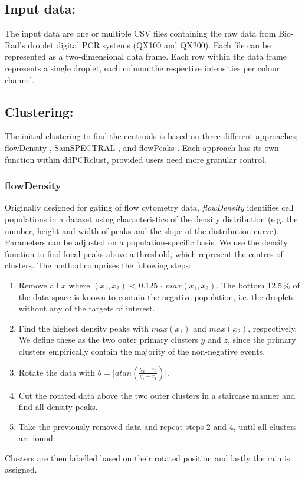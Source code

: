 \documentclass{article}
\begin{document}
\subsection{Input data:}
The input data are one or multiple CSV files containing the raw data from Bio-Rad's droplet digital PCR systems (QX100 and QX200). Each file can be represented as a two-dimensional data frame. Each row within the data frame represents a single droplet, each column the respective intensities per colour channel.

\subsection{Clustering:}
The initial clustering to find the centroids is based on three different approaches; flowDensity \cite{malek2015flowdensity}, SamSPECTRAL \cite{zare2010data}, and flowPeaks \cite{ge2012flowpeaks}. Each approach has its own function within ddPCRclust, provided users need more granular control.

\subsubsection{flowDensity}
Originally designed for gating of flow cytometry data, \emph{flowDensity} identifies cell populations in a dataset using characteristics of the density distribution (e.g. the number, height and width of peaks and the slope of the distribution curve). Parameters can be adjusted on a population-specific basis. We use the density function to find local peaks above a threshold, which represent the centres of clusters. The method comprises the following steps:
\begin{enumerate}
\item Remove all $x$ where $(x_1,x_2)$ < 0.125$\,\cdot\,max(x_1,x_2)$. The bottom 12.5$\,\%$ of the data space is known to contain the negative population, i.e. the droplets without any of the targets of interest.
\item Find the highest density peaks with $max(x_1)$ and $max(x_2)$, respectively. We define these as the two outer primary clusters $y$ and $z$, since the primary clusters empirically contain the majority of the non-negative events.
\item Rotate the data with $\theta = \lvert atan(\frac{y_2 - z_2}{y_1 - z_1}) \rvert$.
\item Cut the rotated data above the two outer clusters in a staircase manner and find all density peaks.
\item Take the previously removed data and repeat steps 2 and 4, until all clusters are found.
\end{enumerate}
Clusters are then labelled based on their rotated position and lastly the rain is assigned.
\end{document}
